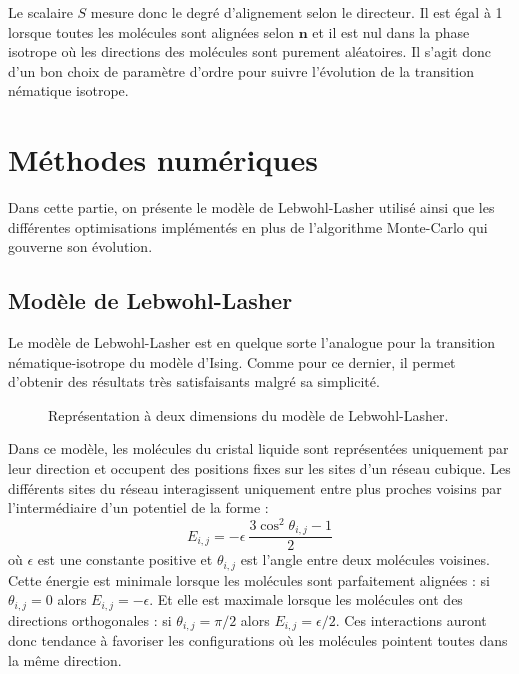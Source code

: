 \documentclass[11pt,a4paper]{article}
\numberwithin{equation}{section}
\begin{document}
Le scalaire $S$ mesure donc le degré d'alignement selon le directeur. Il est égal à 1 lorsque toutes les molécules sont alignées selon $\bm{n}$ et il est nul dans la phase isotrope où les directions des molécules sont purement aléatoires. Il s'agit donc d'un bon choix de paramètre d'ordre pour suivre l'évolution de la transition nématique isotrope.
\newpage
\section{Méthodes numériques}
Dans cette partie, on présente le modèle de Lebwohl-Lasher utilisé ainsi que les différentes optimisations implémentés en plus de l'algorithme Monte-Carlo qui gouverne son évolution.

\subsection{Modèle de Lebwohl-Lasher}
Le modèle de Lebwohl-Lasher \cite{model} est en quelque sorte l'analogue pour la transition nématique-isotrope du modèle d'Ising. Comme pour ce dernier, il permet d'obtenir des résultats très satisfaisants malgré sa simplicité.\medskip

\begin{figure}[h]
    \center
    
    \caption{Représentation à deux dimensions du modèle de Lebwohl-Lasher.}
    \label{lebwohl}
\end{figure}


Dans ce modèle, les molécules du cristal liquide sont représentées uniquement par leur direction et occupent des positions fixes sur les sites d'un réseau cubique.
Les différents sites du réseau interagissent uniquement entre plus proches voisins par l'intermédiaire d'un potentiel de la forme :
\begin{equation}
E_{i,j} = - \epsilon\ \frac{3\cos^2\theta_{i,j}-1}{2}
\label{interact}
\end{equation}
où $\epsilon$ est une constante positive et $\theta_{i,j}$ est l'angle entre deux molécules voisines. 
Cette énergie est minimale lorsque les molécules sont parfaitement alignées : si $\theta_{i,j} = 0$ alors $E_{i,j} = - \epsilon$. Et elle est maximale lorsque les molécules ont des directions orthogonales : si $\theta_{i,j} = \pi/2$ alors $E_{i,j} = \epsilon/2$.
Ces interactions auront donc tendance à favoriser les configurations où les molécules pointent toutes dans la même direction.\medskip
\end{document}
